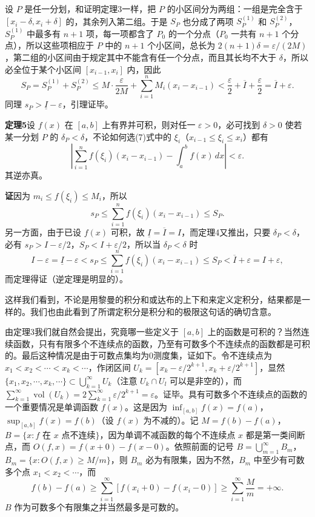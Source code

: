 设 $P$ 是任一分划，和证明定理3一样，把 $P$ 的小区间分为两组：一组是完全含于 $[x_i-\delta,x_i+\delta]$ 的，其余列入第二组。于是 $S_P$ 也分成了两项 $S_P^{(1)}$ 和 $S_P^{(2)}$，$S_P^{(1)}$ 中最多有 $n+1$ 项，每一项都含了 $P_0$ 的一个分点（$P_0$ 一共有 $n+1$ 个分点），所以这些项相应于 $P$ 中的 $n+1$ 个小区间，总长为 $2(n+1)\delta=\varepsilon/(2M)$，第二组的小区间由于规定其中不能含有任一个分点，而且其长均不大于 $\delta$，所以必全位于某个小区间 $[x_{i-1},x_i]$ 内，因此
\[
 S_P=S_P^{(1)}+S_P^{(2)}\le M\cdot\frac{\varepsilon}{2M}
 +\sum_{i=1}^{n}M_i(x_i-x_{i-1})<\frac\varepsilon2+\overline I+\frac\varepsilon2=\overline I+\varepsilon.
\]
同理 $s_P>\underline I-\varepsilon$，引理证毕。

\noindent\textbf{定理5}\quad 设 $f(x)$ 在 $[a,b]$ 上有界并可积，则对任一 $\varepsilon>0$，必可找到 $\delta>0$ 使若某一分划 $P$ 的 $\delta_P<\delta$，不论如何选(7)式中的 $\xi_i$（$x_{i-1}\le\xi_i\le x_i$）都有
\[
 \left|\sum_{i=1}^{n}f(\xi_i)(x_i-x_{i-1})-\int_a^b f(x)\,dx\right|<\varepsilon.
\]
其逆亦真。

\noindent\textbf{证}\quad 因为 $m_i\le f(\xi_i)\le M_i$，所以
\[
 s_P\le\sum_{i=1}^{n}f(\xi_i)(x_i-x_{i-1})\le S_P.
\]
另一方面，由于已设 $f(x)$ 可积，故 $\underline I=\overline I=I$，而定理4又推出，只要 $\delta_P<\delta$，必有 $s_P>I-\varepsilon/2$，$S_P<I+\varepsilon/2$，所以当 $\delta_P<\delta$ 时
\[
 I-\varepsilon=\underline I-\varepsilon<s_P\le\sum_{i=1}^{n}f(\xi_i)(x_i-x_{i-1})\le S_P<\overline I+\varepsilon=I+\varepsilon,
\]
而定理得证（逆定理是明显的）。

这样我们看到，不论是用黎曼的积分和或达布的上下和来定义定积分，结果都是一样的。我们也由此看到了所谓定积分是积分和的极限这句话的确切含意。

由定理3我们就自然会提出，究竟哪一些定义于 $[a,b]$ 上的函数是可积的？当然连续函数，只有有限多个不连续点的函数，乃至有可数多个不连续点的函数都是可积的。最后这种情况是由于可数点集均为0测度集，证如下。令不连续点为 $x_1<x_2<\cdots<x_k<\cdots$，作闭区间 $U_k=[x_k-\varepsilon/2^{k+1},x_k+\varepsilon/2^{k+1}]$，显然 $\{x_1,x_2,\cdots,x_k,\cdots\}\subset\bigcup_{k=1}^{\infty}U_k$（注意 $U_k\cap U_l$ 可以是非空的），而 $\sum_{k=1}^{\infty}\operatorname{vol}(U_k)=2\sum_{k=1}^{\infty}\varepsilon/2^{k+1}=\varepsilon$。证毕。具有可数多个不连续点的函数的一个重要情况是单调函数 $f(x)$。这是因为 $\inf_{[a,b]}f(x)=f(a)$，$\sup_{[a,b]}f(x)=f(b)$（设 $f(x)$ 为不减的）。记 $M=f(b)-f(a)$，$B=\{x:f\text{ 在 }x\text{ 点不连续}\}$，因为单调不减函数的每个不连续点 $x$ 都是第一类间断点，而 $O(f,x)=f(x+0)-f(x-0)$。依照前面的记号 $B=\bigcup_{m=1}^{\infty}B_m$，$B_m=\{x:O(f,x)\ge M/m\}$，则 $B_m$ 必为有限集，因为不然，$B_m$ 中至少有可数多个点 $x_1<x_2<\cdots$，而
\[
 f(b)-f(a)\ge\sum_{i=1}^{\infty}[f(x_i+0)-f(x_i-0)]\ge\sum_{i=1}^{\infty}\frac Mm=+\infty.
\]
$B$ 作为可数多个有限集之并当然最多是可数的。

